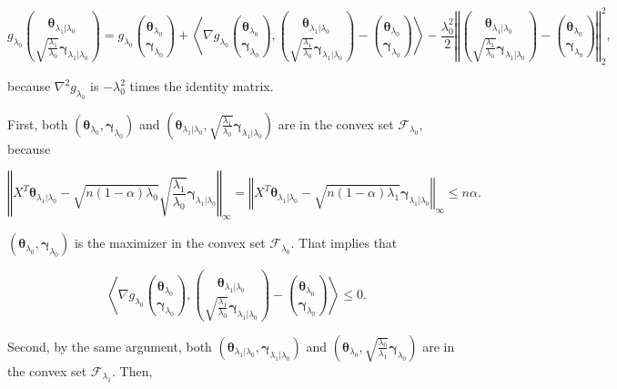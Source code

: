 \begin{equation}
    \label{eq:1.1.1}
    g_{\lambda_0}\binom{\boldsymbol\theta_{\lambda_1|\lambda_0}}{\sqrt{\frac{\lambda_1}{\lambda_0}}\boldsymbol\gamma_{\lambda_1|\lambda_0}}=g_{\lambda_0}\binom{\boldsymbol\theta_{\lambda_0}}{\boldsymbol\gamma_{\lambda_0}}+\left\langle\nabla g_{\lambda_0}\binom{\boldsymbol\theta_{\lambda_0}}{\boldsymbol\gamma_{\lambda_0}},\binom{\boldsymbol\theta_{\lambda_1|\lambda_0}}{\sqrt{\frac{\lambda_1}{\lambda_0}}\boldsymbol\gamma_{\lambda_1|\lambda_0}}-\binom{\boldsymbol\theta_{\lambda_0}}{\boldsymbol\gamma_{\lambda_0}}\right\rangle-\frac{\lambda_0^2}{2}\left\Vert\binom{\boldsymbol\theta_{\lambda_1|\lambda_0}}{\sqrt{\frac{\lambda_1}{\lambda_0}}\boldsymbol\gamma_{\lambda_1|\lambda_0}}-\binom{\boldsymbol\theta_{\lambda_0}}{\boldsymbol\gamma_{\lambda_0}}\right\Vert_2^2,
\end{equation}

because $\nabla^2g_{\lambda_0}$ is $-\lambda_0^2$ times the identity matrix. 

First, both $(\boldsymbol\theta_{\lambda_0},\boldsymbol\gamma_{\lambda_0})$ and $\left(\boldsymbol\theta_{\lambda_1|\lambda_0},\sqrt{\frac{\lambda_1}{\lambda_0}}\boldsymbol\gamma_{\lambda_1|\lambda_0}\right)$ are in the convex set $\mathcal{F}_{\lambda_0}$, because

\begin{equation}
    \left\Vert X^T\boldsymbol\theta_{\lambda_1|\lambda_0}-\sqrt{n(1-\alpha)\lambda_0}\sqrt{\frac{\lambda_1}{\lambda_0}}\boldsymbol\gamma_{\lambda_1|\lambda_0}\right\Vert_\infty= \left\Vert X^T\boldsymbol\theta_{\lambda_1|\lambda_0}-\sqrt{n(1-\alpha)\lambda_1}\boldsymbol\gamma_{\lambda_1|\lambda_0}\right\Vert_\infty\leq n\alpha.
\end{equation}

$(\boldsymbol\theta_{\lambda_0},\boldsymbol\gamma_{\lambda_0})$ is the maximizer in the convex set $\mathcal{F}_{\lambda_0}$. That implies that

\begin{equation}
    \label{eq:1.1.2}
    \left\langle\nabla g_{\lambda_0}\binom{\boldsymbol\theta_{\lambda_0}}{\boldsymbol\gamma_{\lambda_0}},\binom{\boldsymbol\theta_{\lambda_1|\lambda_0}}{\sqrt{\frac{\lambda_1}{\lambda_0}}\boldsymbol\gamma_{\lambda_1|\lambda_0}}-\binom{\boldsymbol\theta_{\lambda_0}}{\boldsymbol\gamma_{\lambda_0}}\right\rangle\leq 0.
\end{equation}

Second, by the same argument, both $(\boldsymbol\theta_{\lambda_1|\lambda_0},\boldsymbol\gamma_{\lambda_1|\lambda_0})$ and $\left(\boldsymbol\theta_{\lambda_0},\sqrt{\frac{\lambda_0}{\lambda_1}}\boldsymbol\gamma_{\lambda_0}\right)$ are in the convex set $\mathcal{F}_{\lambda_1}$. Then,


